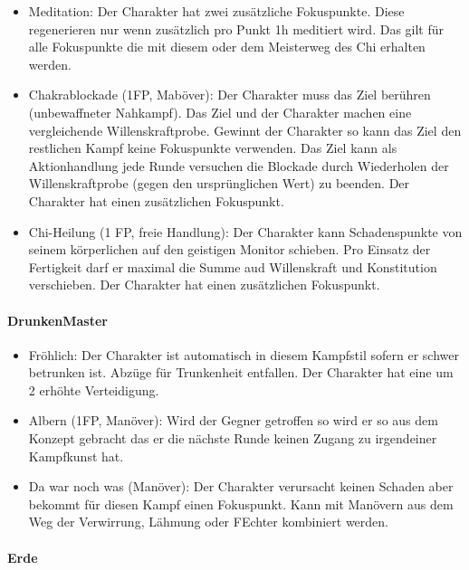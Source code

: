 \documentclass{article}
\begin{document}
\begin{itemize}
\item Meditation: Der Charakter hat zwei zusätzliche Fokuspunkte. Diese regenerieren nur wenn zusätzlich pro Punkt 1h meditiert wird. Das gilt für alle Fokuspunkte die mit diesem oder dem Meisterweg des Chi erhalten werden.
\item Chakrablockade (1FP, Maböver): Der Charakter muss das Ziel berühren (unbewaffneter Nahkampf). Das Ziel und der Charakter machen eine vergleichende Willenskraftprobe. Gewinnt der Charakter so kann das Ziel den restlichen Kampf keine Fokuspunkte verwenden. Das Ziel kann als Aktionhandlung jede Runde versuchen die Blockade durch Wiederholen der Willenskraftprobe (gegen den ursprünglichen Wert) zu beenden. Der Charakter hat einen zusätzlichen Fokuspunkt.
\item Chi-Heilung (1 FP, freie Handlung): Der Charakter kann Schadenspunkte von seinem körperlichen auf den geistigen Monitor schieben. Pro Einsatz der Fertigkeit darf er maximal die Summe aud Willenskraft und Konstitution verschieben. Der Charakter hat einen zusätzlichen Fokuspunkt.
\end{itemize}

\paragraph{DrunkenMaster}

\begin{itemize}
\item Fröhlich: Der Charakter ist automatisch in diesem Kampfstil sofern er schwer betrunken ist. Abzüge für Trunkenheit entfallen. Der Charakter hat eine um 2 erhöhte Verteidigung.
\item Albern (1FP, Manöver): Wird der Gegner getroffen so wird er so aus dem Konzept gebracht das er die nächste Runde keinen Zugang zu irgendeiner Kampfkunst hat.
\item Da war noch was (Manöver): Der Charakter verursacht keinen Schaden aber bekommt für diesen Kampf einen Fokuspunkt. Kann mit Manövern aus dem Weg der Verwirrung, Lähmung oder FEchter kombiniert werden.
\end{itemize}

\paragraph{Erde}
\end{document}
